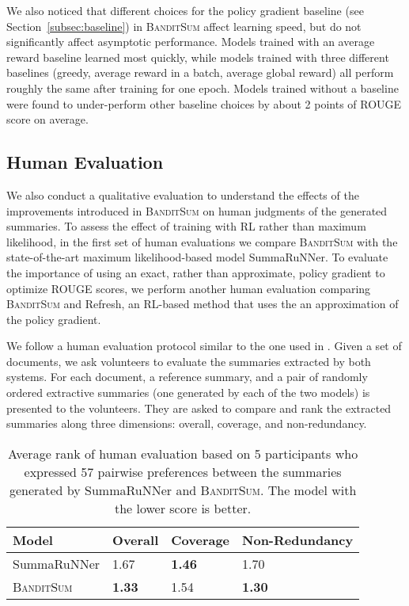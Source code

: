 \documentclass[11pt,a4paper]{article}
\newcommand{\B}{\textsc{BanditSum }}
\begin{document}
We also noticed that different choices for the policy gradient baseline (see Section~\ref{subsec:baseline}) in \B affect learning speed, but do not significantly affect asymptotic performance. Models trained with an average reward baseline learned most quickly, while models trained with three different baselines (greedy, average reward in a batch, average global reward) all perform roughly the same after training for one epoch. Models trained without a baseline were found to under-perform other baseline choices by about 2 points of ROUGE score on average.  






















\subsection{Human Evaluation}
We also conduct a qualitative evaluation to understand the effects of the improvements introduced in \B on human judgments of the generated summaries. To assess the effect of training with RL rather than maximum likelihood, in the first set of human evaluations we compare \B with the state-of-the-art maximum likelihood-based model SummaRuNNer. To evaluate the importance of using an exact, rather than approximate, policy gradient to optimize ROUGE scores, we perform another human evaluation comparing \B and Refresh, an RL-based method that uses the an approximation of the policy gradient.

We follow a human evaluation protocol similar to the one used in \citet{DBLP:conf/aaai/WuH18}. Given a set of  documents, we ask  volunteers to evaluate the summaries extracted by both systems. For each document, a reference summary, and a pair of randomly ordered extractive summaries (one generated by each of the two models) is presented to the volunteers. They are asked to compare and rank the extracted summaries along three dimensions: overall, coverage, and non-redundancy.

\begin{table}[h!]
\small
\begin{center}
\begin{tabularx}{\columnwidth}{|l|X|X|X|}
\hline
Model & Overall & Coverage & Non-Redundancy \\ \hline
SummaRuNNer & 1.67 &\textbf{1.46}  &1.70  \\ \hline
\B & \textbf{1.33} & 1.54 & \textbf{1.30} \\ \hline
\end{tabularx}
\end{center}
\caption{Average rank of human evaluation based on 5 participants who expressed 57 pairwise preferences between the summaries generated by SummaRuNNer and \textsc{BanditSum}. The model with the lower score is better.}
\label{table:human_eval_summarunner}
\end{table}
\end{document}
